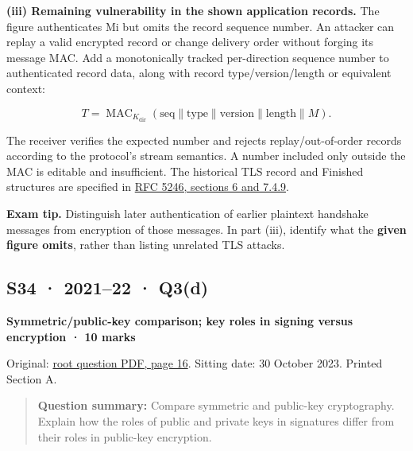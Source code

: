 \documentclass[11pt,a4paper]{article}
\begin{document}
\textbf{(iii) Remaining vulnerability in the shown application records.} The figure authenticates Mi but omits the record sequence number. An attacker can replay a valid encrypted record or change delivery order without forging its message MAC. Add a monotonically tracked per-direction sequence number to authenticated record data,\allowbreak{} along with record type/\allowbreak{}version/\allowbreak{}length or equivalent context:



\[
T=\operatorname{MAC}_{K_{\mathrm{dir}}}\!\left(\mathrm{seq}\parallel\mathrm{type}\parallel\mathrm{version}\parallel\mathrm{length}\parallel M\right).
\]

The receiver verifies the expected number and rejects replay/\allowbreak{}out-of-order records according to the protocol’s stream semantics. A number included only outside the MAC is editable and insufficient. The historical TLS record and Finished structures are specified in \href{https://www.rfc-editor.org/rfc/rfc5246}{RFC 5246,\allowbreak{} sections 6 and 7.4.9}.



{\color{ForestGreen}\textbf{Exam tip.} Distinguish later authentication of earlier plaintext handshake messages from encryption of those messages. In part (iii),\allowbreak{} identify what the \textbf{given figure omits},\allowbreak{} rather than listing unrelated TLS attacks.}




\clearpage
\subsection{S34 · 2021–22 · Q3(d)}\label{s34}

\textbf{Symmetric/\allowbreak{}public-key comparison; key roles in signing versus encryption · 10 marks}


Original: \href{../../CSE405-Security_Merged.pdf\#page=16}{root question PDF,\allowbreak{} page 16}. Sitting date: 30 October 2023. Printed Section A.



\begin{quote}\small

\textbf{Question summary:} Compare symmetric and public-key cryptography. Explain how the roles of public and private keys in signatures differ from their roles in public-key encryption.



\end{quote}
\end{document}
